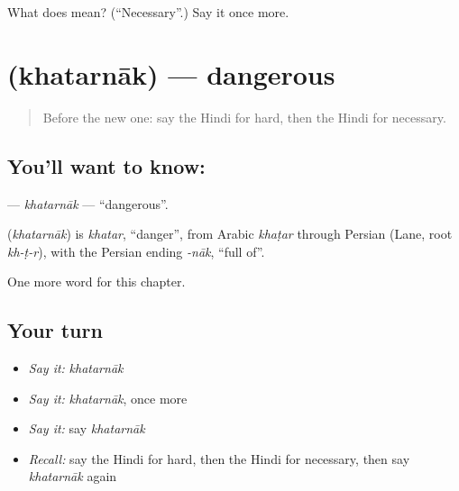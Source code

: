 \begin{tcolorbox}[breakable,colback=teal!4,colframe=teal!35!black,title={Before you move on}]
What does  mean? (\textquotedblleft{}Necessary\textquotedblright{}.) Say it once more.
\end{tcolorbox}
\section[\texorpdfstring{\hi{ख़तरनाक} (khatarnāk)}{ख़तरनाक (khatarnāk)}]{ (khatarnāk) — dangerous}

\label{lesson:HI-C213-khatarnak}



\begin{quote}
Before the new one: say the Hindi for hard, then the Hindi for necessary.
\end{quote}

\subsection*{You'll want to know: }
\textbf{} — \emph{khatarnāk} — \textquotedblleft{}dangerous\textquotedblright{}.

\begin{cousinweb}
\textbf{} (\emph{khatarnāk}) is \emph{khatar}, \textquotedblleft{}danger\textquotedblright{}, from Arabic \emph{khaṭar} through Persian (Lane, root \emph{kh-ṭ-r}), with the Persian ending \emph{-nāk}, \textquotedblleft{}full of\textquotedblright{}.
\end{cousinweb}

\begin{grammarlens}[title={What you've built}]
One more word for this chapter.
\end{grammarlens}

\subsection*{Your turn}
\begin{itemize}
\raggedright
  \item \emph{Say it:} \emph{khatarnāk}
  \item \emph{Say it:} \emph{khatarnāk}, once more
  \item \emph{Say it:} say \emph{khatarnāk}
  \item \emph{Recall:} say the Hindi for hard, then the Hindi for necessary, then say \emph{khatarnāk} again
\end{itemize}

